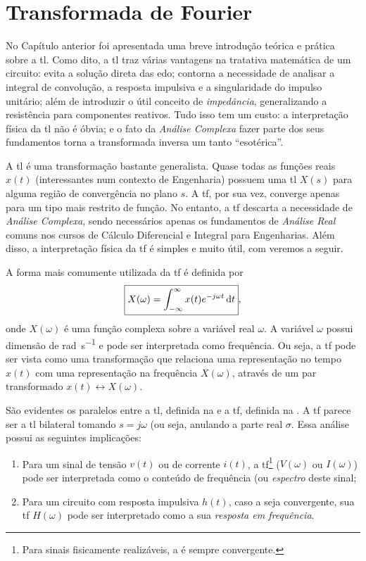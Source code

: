 \chapter{Transformada de Fourier}

No Capítulo anterior foi apresentada uma breve introdução teórica e prática sobre a \ac{tl}. Como dito, a \ac{tl} traz várias vantagens na tratativa matemática de um circuito: evita a solução direta das \ac{edo}; contorna a necessidade de analisar a integral de convolução, a resposta impulsiva e a singularidade do impulso unitário; além de introduzir o útil conceito de \emph{impedância}, generalizando a resistência para componentes reativos. Tudo isso tem um custo: a interpretação física da \ac{tl} não é óbvia; e o fato da \emph{Análise Complexa} fazer parte dos seus fundamentos torna a transformada inversa um tanto \enquote{esotérica}.

A \ac{tl} é uma transformação bastante generalista. Quase todas as funções reais $x(t)$ (interessantes num contexto de Engenharia) possuem uma \ac{tl} $X(s)$ para alguma região de convergência no plano $s$. A \ac{tf}, por sua vez, converge apenas para um tipo mais restrito de função. No entanto, a \ac{tf} descarta a necessidade de \emph{Análise Complexa}, sendo necessários apenas os fundamentos de \emph{Análise Real} comuns nos cursos de Cálculo Diferencial e Integral para Engenharias. Além disso, a interpretação física da \ac{tf} é simples e muito útil, com veremos a seguir.

A forma mais comumente utilizada da \ac{tf} é definida por
\begin{equation}\label{eq:tfo}
	\boxed{X(\omega)=\inte{x(t)e^{-j\omega t}}{t}{-\infty}{\infty}},
\end{equation}
onde $X(\omega)$ é uma função complexa sobre a variável real $\omega$. A variável $\omega$ possui dimensão de \unit{\radian\per\second} e pode ser interpretada como frequência. Ou seja, a \ac{tf} pode ser vista como uma transformação que relaciona uma representação no tempo $x(t)$ com uma representação na frequência $X(\omega)$, através de um par transformado $x(t)\longleftrightarrow X(\omega)$.

São evidentes os paralelos entre a \ac{tl}, definida na  e a \ac{tf}, definida na . A \ac{tf} parece ser a \ac{tl} bilateral tomando $s=j\omega$ (ou seja, anulando a parte real $\sigma$. Essa análise possui as seguintes implicações:
\begin{enumerate}
	\item Para um sinal de tensão $v(t)$ ou de corrente $i(t)$, a \ac{tf}\footnote{Para sinais fisicamente realizáveis, a  é sempre convergente.} ($V(\omega)$ ou $I(\omega)$) pode ser interpretada como o conteúdo de frequência (ou \emph{espectro} deste sinal;
	\item Para um circuito com resposta impulsiva $h(t)$, caso a  seja convergente, sua \ac{tf} $H(\omega)$ pode ser interpretado como a sua \emph{resposta em frequência}.
\end{enumerate}

